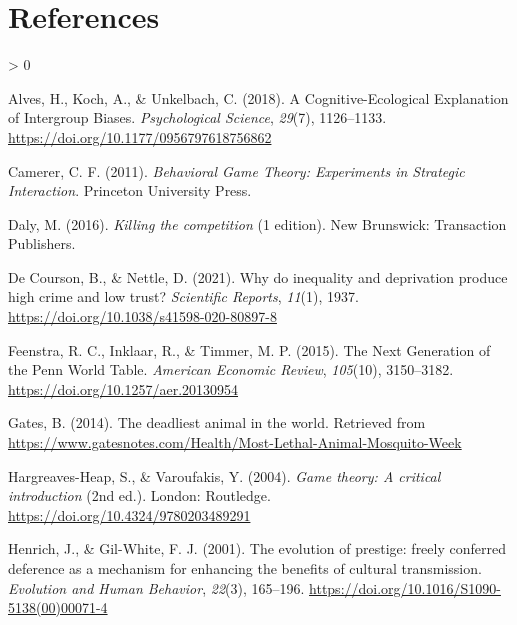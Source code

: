 \documentclass[
  english,
  man]{apa6}
\newlength{\cslhangindent}
\newenvironment{CSLReferences}[2] %
 {%
  \setlength{\parindent}{0pt}
  \ifodd #1 \everypar{\setlength{\hangindent}{\cslhangindent}}\ignorespaces\fi
  \ifnum #2 > 0
  \setlength{\parskip}{#2\baselineskip}
  \fi
 }%
 {}
\begin{document}
\newpage

\hypertarget{references}{%
\section{References}\label{references}}

\begingroup
\setlength{\parindent}{-0.5in}
\setlength{\leftskip}{0.5in}

\hypertarget{refs}{}
\begin{CSLReferences}{1}{0}
\leavevmode\hypertarget{ref-alves2018}{}%
Alves, H., Koch, A., \& Unkelbach, C. (2018). A Cognitive-Ecological Explanation of Intergroup Biases. \emph{Psychological Science}, \emph{29}(7), 1126--1133. \url{https://doi.org/10.1177/0956797618756862}

\leavevmode\hypertarget{ref-camerer2011}{}%
Camerer, C. F. (2011). \emph{Behavioral Game Theory: Experiments in Strategic Interaction}. Princeton University Press.

\leavevmode\hypertarget{ref-daly2016}{}%
Daly, M. (2016). \emph{Killing the competition} (1 edition). New Brunswick: Transaction Publishers.

\leavevmode\hypertarget{ref-decourson2021}{}%
De Courson, B., \& Nettle, D. (2021). Why do inequality and deprivation produce high crime and low trust? \emph{Scientific Reports}, \emph{11}(1), 1937. \url{https://doi.org/10.1038/s41598-020-80897-8}

\leavevmode\hypertarget{ref-feenstra2015}{}%
Feenstra, R. C., Inklaar, R., \& Timmer, M. P. (2015). The Next Generation of the Penn World Table. \emph{American Economic Review}, \emph{105}(10), 3150--3182. \url{https://doi.org/10.1257/aer.20130954}

\leavevmode\hypertarget{ref-gates2014}{}%
Gates, B. (2014). The deadliest animal in the world. Retrieved from \url{https://www.gatesnotes.com/Health/Most-Lethal-Animal-Mosquito-Week}

\leavevmode\hypertarget{ref-hargreaves-heap2004}{}%
Hargreaves-Heap, S., \& Varoufakis, Y. (2004). \emph{Game theory: A critical introduction} (2nd ed.). London: Routledge. \url{https://doi.org/10.4324/9780203489291}

\leavevmode\hypertarget{ref-henrich2001}{}%
Henrich, J., \& Gil-White, F. J. (2001). The evolution of prestige: freely conferred deference as a mechanism for enhancing the benefits of cultural transmission. \emph{Evolution and Human Behavior}, \emph{22}(3), 165--196. \url{https://doi.org/10.1016/S1090-5138(00)00071-4}


\end{CSLReferences}
\end{document}
